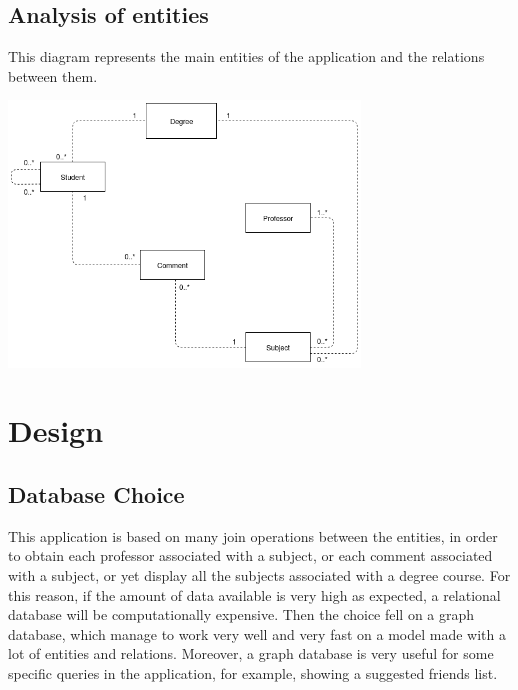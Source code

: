 \documentclass[a4paper]{article}
\begin{document}
\clearpage

\subsection{Analysis of entities}
This diagram represents the main entities of the application and the relations between them.
\begin{minipage}{\linewidth}
\begin{center}
\vspace{4mm}
\includegraphics[width = 0.7\textwidth]{./images/diagrams/AnalysisUML.png} 
\vspace{2mm}
\label{fig:analisys_diagram}
\end{center}
\end{minipage}

\clearpage
\section{Design}

\subsection{Database Choice}
This application is based on many join operations between the entities, in order to obtain each professor associated with a subject, or each comment associated with a subject, or yet display all the subjects associated with a degree course. For this reason, if the amount of data available is very high as expected, a relational database will be computationally expensive. Then the choice fell on a graph database, which manage to work very well and very fast on a model made with a lot of entities and relations. Moreover, a graph database is very useful for some specific queries in the application, for example, showing a suggested friends list. \\
\end{document}
